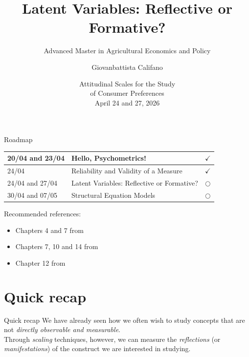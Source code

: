 \documentclass{beamer}
\title[Lecture 3]{Latent Variables: Reflective or Formative?}
\subtitle{Advanced Master in Agricultural Economics and Policy}
\author{Giovanbattista Califano}
\date[Portici, 24/04/2026]{Attitudinal Scales for the Study \\ of Consumer Preferences \\ April 24 and 27, 2026}
\institute[UNINA]{University of Naples Federico II, giovanbattista.califano@unina.it}
\begin{document}
\frame{\titlepage}

\begin{frame}{Roadmap}
    \begin{center}
        \begin{tabular}{|l|l|c|}
        \hline
        20/04 and 23/04 &  Hello, Psychometrics! & $\checkmark$ \\
        \hline
        24/04 & Reliability and Validity of a Measure & $\checkmark$ \\
        \hline
       24/04 and 27/04 & Latent Variables: Reflective or Formative? & $\bigcirc$ \\
        \hline
        30/04 and 07/05 & Structural Equation Models & $\bigcirc$ \\
        \hline
        \end{tabular}
    \end{center}
\vspace{0.1cm}
\footnotesize
Recommended references: \\
\begin{itemize}
    \item Chapters 4 and 7 from \cite{jhangiani2019research}
    \item Chapters 7, 10 and 14 from \cite{olivero2022psicologia}
    \item Chapter 12 from \cite{mehmetoglu2022applied}
\end{itemize}
\scriptsize


\end{frame}

\section{Quick recap}
\begin{frame}{Quick recap}
    We have already seen how we often wish to study concepts that are not \textit{directly observable and measurable}. \\
    \vspace{1em}
    Through \textit{scaling} techniques, however, we can measure the \textit{reflections} (or \textit{manifestations}) of the construct we are interested in studying.
\end{frame}
\end{document}
